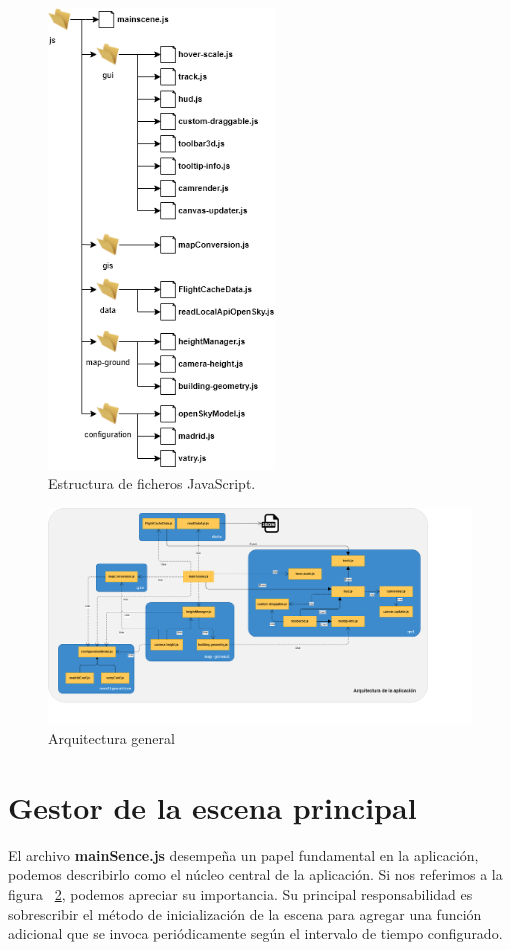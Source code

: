 \documentclass[a4paper, 11pt]{book}
\begin{document}
\begin{figure}[h]
  \centering
  \includegraphics[width=6cm, keepaspectratio]{img/ficheros.drawio.png}
  \caption{Estructura de ficheros JavaScript.}
  \label{fig:javascriptFiles}
\end{figure}

\begin{center}
\begin{figure}[h]
  \centering
  \includegraphics[width=18cm, keepaspectratio]{img/Arquitectura.png}
  \caption{Arquitectura general}
  \label{fig:arquitectura}
\end{figure}
\end{center}
\section{Gestor de la escena principal}
\label{sec:mainScene.js}
El archivo \textbf{mainSence.js} desempeña un papel fundamental en la aplicación, podemos describirlo como el núcleo central de la aplicación. Si nos referimos a la figura ~\ref{fig:arquitectura}, podemos apreciar su importancia. Su principal responsabilidad es sobrescribir el método de inicialización de la escena para agregar una función adicional que se invoca periódicamente según el intervalo de tiempo configurado.
\end{document}
